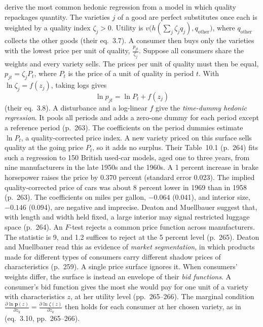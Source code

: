  \citet[Section~10.3, pp.~262--266]{DeatonMuellbauer1980b} derive the most common
hedonic regression from a model in which quality repackages quantity. The varieties $j$ of a good are perfect
substitutes once each is weighted by a quality index $\zeta_j > 0$. Utility is
$v\bigl(h(\sum_j\zeta_jq_j),q_{\mathrm{other}}\bigr)$, where $q_{\mathrm{other}}$ collects the other goods (their
eq.~3.7). A consumer then buys only the varieties with the lowest price per unit of quality,
$\frac{p_{jt}}{\zeta_j}$. Suppose all consumers share the weights and every variety sells. The prices per unit of
quality must then be equal, $p_{jt} = \zeta_jP_t$, where $P_t$ is the price of a unit of quality in period $t$. With
$\ln\zeta_j = f(z_j)$, taking logs gives
\begin{equation}\label{eq:10-dm-hedonic}
  \ln p_{jt} = \ln P_t + f(z_j)
\end{equation}
(their eq.~3.8). A disturbance and a log-linear $f$ give the \emph{time-dummy hedonic regression}. It pools all periods
and adds a zero-one dummy for each period except a reference period (p.~263). The coefficients on the
period dummies estimate $\ln P_t$, a quality-corrected price index. A new variety priced on this surface sells
quality at the going price $P_t$, so it adds no surplus. Their Table~10.1 (p.~264) fits such a regression to 150
British used-car models, aged one to three years, from nine manufacturers in the late 1950s and the 1960s. A 1
percent increase in brake horsepower raises the price by 0.370 percent (standard error 0.023). The implied
quality-corrected price of cars was about 8 percent lower in 1969 than in 1958 (p.~263). The coefficients on miles
per gallon, $-0.064$ (0.041), and interior size, $-0.146$ (0.094), are negative and imprecise. Deaton and Muellbauer
suggest that, with length and width held fixed, a large interior may signal restricted luggage space (p.~264).
An $F$-test rejects a common price function across manufacturers. The statistic is 9, and 1.2 suffices to reject at
the 5 percent level (p.~265). Deaton and Muellbauer read this as evidence of \emph{market segmentation}, in which
products made for different types of consumers carry different shadow prices of characteristics (p.~259). A single
price surface ignores it. When consumers' weights differ, the surface is instead an envelope of their
\emph{bid functions}. A consumer's bid function gives the most she would pay for one unit of a variety with
characteristics $z$, at her utility level (pp.~265--266). The marginal condition
$\frac{\partial\ln\mathbf{p}(z)}{\partial z_k} = \frac{\partial\ln\zeta(z)}{\partial z_k}$ then holds for each
consumer at her chosen variety, as in \citet{Rosen1974} (eq.~3.10, pp.~265--266).

